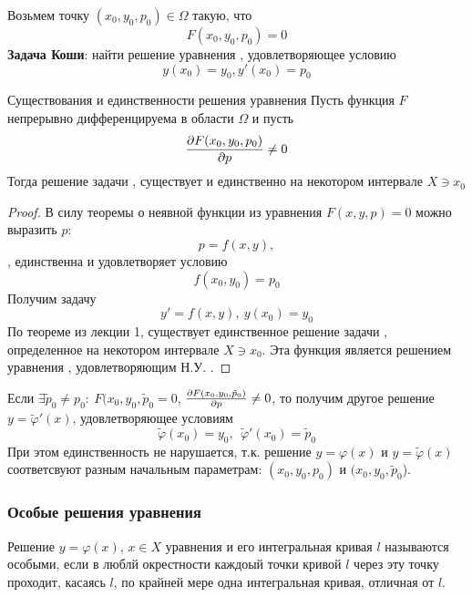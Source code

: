   Возьмем точку $(x_0, y_0, p_0) \in \Omega$ такую, что
  \[ F(x_0, y_0, p_0) = 0 \]
  \textbf{Задача Коши}: найти решение уравнения , удовлетворяющее условию 
  \begin{equation}
  \label{four.four}
  y(x_0) = y_0, y'(x_0) = p_0
  \end{equation}
  \begin{teo}{Существования и единственности решения уравнения }
  Пусть функция $F$ непрерывно дифференцируема в области $\Omega$ и пусть 
  \begin{equation}
  \frac{\partial {F(x_0, y_0, p_0)}}{\partial {p}} \neq 0
  \end{equation}
  Тогда решение задачи ,  существует и единственно на некотором интервале $X \ni x_0$
  \end{teo}
  \begin{proof}
  В силу теоремы о неявной функции из уравнения $F(x, y, p) = 0$ можно выразить $p$:
  \[ p = f(x, y), \]
  , единственна и удовлетворяет условию
  \[ f(x_0, y_0) = p_0 \]
  Получим задачу
  \begin{equation}
  \label{four.six}
  y' = f(x, y),~ y(x_0) = y_0
  \end{equation}
  По теореме  из лекции 1, существует единственное решение задачи , определенное на некотором интервале $X \ni x_0$. Эта функция является решением уравнения , удовлетворяющим Н.У. .
  \end{proof}

  \begin{ntc}
  Если $\exists \tilde{p}_0 \neq p_0:~ F(x_0, y_0, \tilde{p}_0 = 0$, $\frac{\partial {F(x_0, y_0, \tilde{p}_0)}}{\partial {p}} \neq 0$, то получим другое решение $y = \tilde{\varphi}'(x)$, удовлетворяющее условиям
  \[ \tilde{\varphi}(x_0) = y_0,~~ \tilde{\varphi}'(x_0) = \tilde{p}_0 \]
  При этом единственность не нарушается, т.к. решение $y = \varphi(x)$ и $y = \tilde{\varphi}(x)$ соответсвуют разным начальным параметрам: $(x_0, y_0, p_0)$ и $(x_0, y_0, \tilde{p}_0$).
  \end{ntc}

  \subsubsection{Особые решения уравнения }
  \begin{df}
  Решение $y = \varphi(x)$, $x \in X$ уравнения  и его интегральная кривая $l$ называются особыми, если в люблй окрестности каждоый точки кривой $l$ через эту точку проходит, касаясь $l$, по крайней мере одна интегральная кривая, отличная от $l$.
  \end{df}

